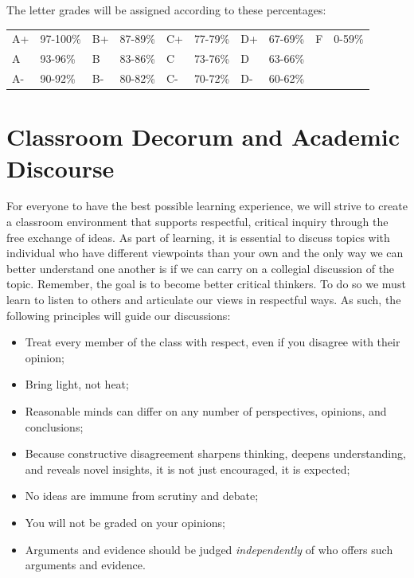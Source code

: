 \documentclass[11pt]{article}
\begin{document}
The letter grades will be assigned according to these percentages:

\begin{center}
	\begin{tabular}{ l l l l l l l l l l}
		\toprule
 		A+ & 97-100\% & B+ & 87-89\% & C+ & 77-79\% & D+ & 67-69\% & F & 0-59\% \\
		A & 93-96\% & B & 83-86\% & C & 73-76\% & D & 63-66\% \\
		A- & 90-92\% & B- & 80-82\% & C- & 70-72\% & D- & 60-62\% \\
		\bottomrule    
	\end{tabular}
\end{center}


\section*{Classroom Decorum and Academic Discourse}

For everyone to have the best possible learning experience, we will strive to create a classroom environment that supports respectful, critical inquiry through the free exchange of ideas. As part of learning, it is essential to discuss topics with individual who have different viewpoints than your own and the only way we can better understand one another is if we can carry on a collegial discussion of the topic. Remember, the goal is to become better critical thinkers. To do so we must learn to listen to others and articulate our views in respectful ways. As such, the following principles will guide our discussions:

\begin{itemize}
\item Treat every member of the class with respect, even if you disagree with their opinion;
\item Bring light, not heat;
\item Reasonable minds can differ on any number of perspectives, opinions, and conclusions;
\item Because constructive disagreement sharpens thinking, deepens understanding, and reveals novel insights, it is not just encouraged, it is expected;
\item No ideas are immune from scrutiny and debate;
\item You will not be graded on your opinions;
\item Arguments and evidence should be judged \emph{independently} of who offers such arguments and evidence. 
\end{itemize}
\end{document}
